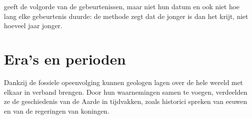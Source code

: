  geeft de volgorde van de gebeurtenissen, maar niet hun
datum en ook niet hoe lang elke gebeurtenis duurde: de methode zegt dat de
 jonger is dan het krijt, niet hoeveel jaar jonger.

\section{Era's en perioden}

Dankzij de fossiele opeenvolging kunnen geologen lagen over de hele wereld
met elkaar in verband brengen. Door hun waarnemingen samen te voegen,
verdeelden ze de geschiedenis van de Aarde in tijdvakken, zoals historici
spreken van eeuwen en van de regeringen van koningen.

